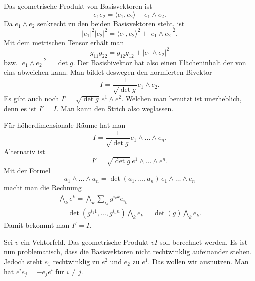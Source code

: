 \documentclass[a4paper,11pt,fleqn,twocolumn,twoside]{scrartcl}
\numberwithin{equation}{section}
\begin{document}
Das geometrische Produkt von Basisvektoren ist
\begin{equation}
e_1e_2 = \langle e_1,e_2\rangle + e_1\wedge e_2.
\end{equation}
Da $e_1\wedge e_2$ senkrecht zu den beiden Basisvektoren steht, ist
\begin{equation}
|e_1|^2|e_2|^2 = \langle e_1,e_2\rangle^2+|e_1\wedge e_2|^2.
\end{equation}
Mit dem metrischen Tensor erhält man
\begin{equation}
g_{11} g_{22} = g_{12} g_{12} + |e_1\wedge e_2|^2
\end{equation}
bzw. $|e_1\wedge e_2|^2 = \det g.$
Der Basisbivektor hat also einen Flächeninhalt der von eins abweichen
kann. Man bildet deswegen den normierten Bivektor
\begin{equation}
I = \frac{1}{\sqrt{\det g}}e_1\wedge e_2.
\end{equation}
Es gibt auch noch $I'=\sqrt{\det g}\,e^1\wedge e^2$. Welchen man
benutzt ist unerheblich, denn es ist $I'=I$. Man kann den Strich
also weglassen.

Für höherdimensionale Räume hat man
\begin{equation}
I = \frac{1}{\sqrt{\det g}}e_1\wedge\ldots\wedge e_n.
\end{equation}
Alternativ ist
\begin{equation}
I' = \sqrt{\det g}\,e^1\wedge\ldots\wedge e^n.
\end{equation}
Mit der Formel
\begin{equation}
a_1\wedge\ldots\wedge a_n
= \det(a_1,\ldots,a_n)\,e_1\wedge\ldots\wedge e_n
\end{equation}
macht man die Rechnung
\begin{gather*}
\bigwedge_k e^k
= \bigwedge_k \sum_{i_k} g^{{i_k}k} e_{i_k}\\
= \det(g^{{i_1}1},\ldots,g^{{i_n}n})\bigwedge_k e_k
= \det(g)\bigwedge_k e_k.
\end{gather*}
Damit bekommt man $I'=I$.

Sei $v$ ein Vektorfeld. Das geometrische Produkt $vI$
soll berechnet werden. Es ist nun problematisch, dass die
Basisvektoren nicht rechtwinklig aufeinander stehen. Jedoch
steht $e_1$ rechtwinklig zu $e^2$ und $e_2$ zu $e^1$.
Das wollen wir ausnutzen. Man hat $e^ie_j=-e_je^i$ für $i\ne j$.
\end{document}
